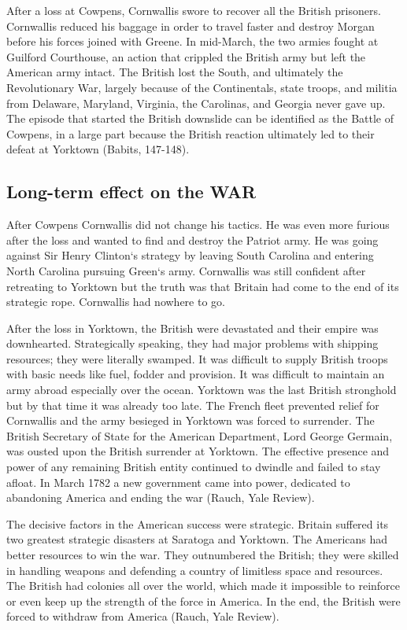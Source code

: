 After a loss at Cowpens, Cornwallis swore to recover all the British prisoners. Cornwallis reduced his baggage in order to travel faster and destroy Morgan before his forces joined with Greene. In mid-March, the two armies fought at Guilford Courthouse, an action that crippled the British army but left the American army intact. The British lost the South, and ultimately the Revolutionary War, largely because of the Continentals, state troops, and militia from Delaware, Maryland, Virginia, the Carolinas, and Georgia never gave up. The episode that started the British downslide can be identified as the Battle of Cowpens, in a large part because the British reaction ultimately led to their defeat at Yorktown (Babits, 147-148).

\subsection{Long-term effect on the WAR}

After Cowpens Cornwallis did not change his tactics. He was even more furious after the loss and wanted to find and destroy the Patriot army. He was going against Sir Henry Clinton`s strategy by leaving South Carolina and entering North Carolina pursuing Green`s army. Cornwallis was still confident after retreating to Yorktown but the truth was that Britain had come to the end of its strategic rope. Cornwallis had nowhere to go.

After the loss in Yorktown, the British were devastated and their empire was downhearted. Strategically speaking, they had major problems with shipping resources; they were literally swamped. It was difficult to supply British troops with basic needs like fuel, fodder and provision. It was difficult to maintain an army abroad especially over the ocean. Yorktown was the last British stronghold but by that time it was already too late. The French fleet prevented relief for Cornwallis and the army besieged in Yorktown was forced to surrender. The British Secretary of State for the American Department, Lord George Germain, was ousted  upon the British surrender at Yorktown.  The effective presence and power of any remaining British entity continued to dwindle and failed to stay afloat. In March 1782 a new government came into power, dedicated to abandoning America and ending the war (Rauch, Yale Review).

The decisive factors in the American success were strategic. Britain suffered its two greatest strategic disasters at Saratoga and Yorktown. The Americans had better resources to win the war.  They outnumbered the British; they were skilled in handling weapons and defending a country of limitless space and resources. The British had colonies all over the world, which made it impossible to reinforce or even keep up the strength of the force in America. In the end, the British were forced to withdraw from America (Rauch, Yale Review).

